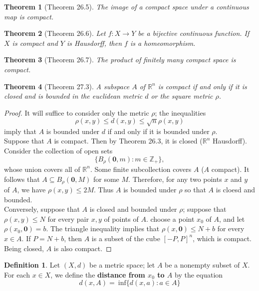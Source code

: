 \documentclass{article}
\newtheorem{theorem}{Theorem}
\theoremstyle{definition}
\newtheorem{definition}{Definition}[section]
\theoremstyle{remark}
\begin{document}
    \begin{theorem}[Theorem 26.5]
        The image of a compact space under a continuous map is compact.
    \end{theorem}

    \begin{theorem}[Theorem 26.6]
        Let $f: X\to Y$ be a bijective continuous function. If $X$ is compact and $Y$ is Hausdorff, then $f$ is a homeomorphism.
    \end{theorem}

    \begin{theorem}[Theorem 26.7]
        The product of finitely many compact space is compact.
    \end{theorem}

    \begin{theorem}[Theorem 27.3]
        A subspace $A$ of $\mathbb{R}^n$ is compact if and only if it is closed and is bounded in the euclidean metric $d$ or the
        square metric $\rho$.
    \end{theorem}
    \begin{proof}
        It will suffice to consider only the metric $\rho$; the inequalities
        \[ \rho(x,y) \leq d(x,y) \leq \sqrt{n}\rho(x,y) \]
        imply that $A$ is bounded under $d$ if and only if it is bounded under $\rho$.\\
        Suppose that $A$ is compact. Then by Theorem 26.3, it is closed ($\mathbb{R}^n$ Hausdorff). Consider the collection of open
        sets
        \[ \{ B_{\rho}(\mathbf{0},m): m\in\mathbb{Z_+}\}, \]
        whose union covers all of $\mathbb{R}^n$. Some finite subcollection covers $A$ ($A$ compact). It follows that
        $A\subseteq B_{\rho}(\mathbf{0},M)$ for some $M$. Therefore, for any two points $x$ and $y$ of $A$, we have $\rho(x,y)\leq2M$.
        Thus $A$ is bounded under $\rho$ so that $A$ is cloesd and bounded.\\
        Conversely, suppose that $A$ is closed and bounded under $\rho$; suppose that $\rho(x,y)\leq N$ for every pair $x,y$ of points
        of $A$. choose a point $x_0$ of $A$, and let $\rho(x_0,\mathbf{0}) = b$. The triangle inequality implies that 
        $\rho(x,\mathbf{0}) \leq N + b$ for every $x\in A$. If $P = N + b$, then $A$ is a subset of the cube $[-P,P]^n$, which is
        compact. Being closed, $A$ is also compact.
    \end{proof}

    \begin{definition}
        Let $(X,d)$ be a metric space; let $A$ be a nonempty subset of $X$. For each $x\in X$, we define the \textbf{distance from $x_0$
            to $A$} by the equation
        \[ d(x,A) =\:\text{inf}\{d(x,a): a\in A\} \]
    \end{definition}
\end{document}
